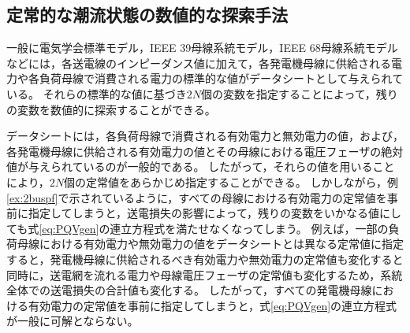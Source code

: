 \documentclass[tombow,dvipdfmx]{corona-a5-1.1}
\begin{document}




\subsection{定常的な潮流状態の数値的な探索手法}


一般に電気学会標準モデル\cite{ieejstandardmodel}，IEEE 39母線系統モデル\cite{athay1979practical}，IEEE 68母線系統モデル\cite{singh2013ieee}などには，各送電線のインピーダンス値に加えて，各発電機母線に供給される電力や各負荷母線で消費される電力の標準的な値がデータシートとして与えられている。
それらの標準的な値に基づき$2N$個の変数を指定することによって，残りの変数を数値的に探索することができる。


データシートには，各負荷母線で消費される有効電力と無効電力の値，および，各発電機母線に供給される有効電力の値とその母線における電圧フェーザの絶対値が与えられているのが一般的である。
したがって，それらの値を用いることにより，$2N$個の定常値をあらかじめ指定することができる。
しかしながら，例\ref{ex:2buspf}で示されているように，すべての母線における有効電力の定常値を事前に指定してしまうと，送電損失の影響によって，残りの変数をいかなる値にしても式\ref{eq:PQVgen}の連立方程式を満たせなくなってしまう。
例えば，一部の負荷母線における有効電力や無効電力の値をデータシートとは異なる定常値に指定すると，発電機母線に供給されるべき有効電力や無効電力の定常値も変化すると同時に，送電網を流れる電力や母線電圧フェーザの定常値も変化するため，系統全体での送電損失の合計値も変化する。
したがって，すべての発電機母線における有効電力の定常値を事前に指定してしまうと，式\ref{eq:PQVgen}の連立方程式が一般に可解とならない。
\end{document}
